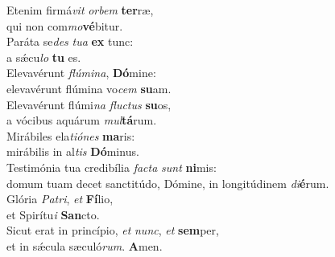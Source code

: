 \evenverse Etenim firmá\textit{vit} \textit{or}\textit{bem} \textbf{ter}ræ,~\*\\
\evenverse qui non com\textit{mo}\textbf{vé}bitur.\\
\oddverse Paráta se\textit{des} \textit{tu}\textit{a} \textbf{ex} tunc:~\*\\
\oddverse a sǽcu\textit{lo} \textbf{tu} es.\\
\evenverse Elevavérunt \textit{flú}\textit{mi}\textit{na}, \textbf{Dó}mine:~\*\\
\evenverse elevavérunt flúmina vo\textit{cem} \textbf{su}am.\\
\oddverse Elevavérunt flúmi\textit{na} \textit{flu}\textit{ctus} \textbf{su}os,~\*\\
\oddverse a vócibus aquárum \textit{mul}\textbf{tá}rum.\\
\evenverse Mirábiles ela\textit{ti}\textit{ó}\textit{nes} \textbf{ma}ris:~\*\\
\evenverse mirábilis in al\textit{tis} \textbf{Dó}minus.\\
\oddverse Testimónia tua credibília \textit{fa}\textit{cta} \textit{sunt} \textbf{ni}mis:~\*\\
\oddverse domum tuam decet sanctitúdo, Dómine, in longitúdinem \textit{di}\textbf{é}rum.\\
\evenverse Glória \textit{Pa}\textit{tri}, \textit{et} \textbf{Fí}lio,~\*\\
\evenverse et Spirítu\textit{i} \textbf{San}cto.\\
\oddverse Sicut erat in princípio, \textit{et} \textit{nunc}, \textit{et} \textbf{sem}per,~\*\\
\oddverse et in sǽcula sæculó\textit{rum}. \textbf{A}men.\\
